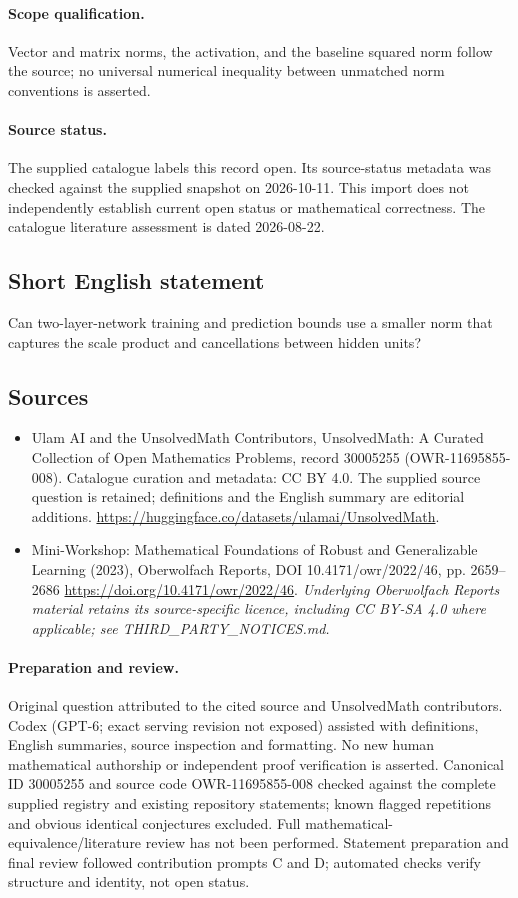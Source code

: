 \documentclass[11pt]{article}
\begin{document}
\paragraph{Scope qualification.}
Vector and matrix norms, the activation, and the baseline squared norm follow the source; no universal numerical inequality between unmatched norm conventions is asserted.
\paragraph{Source status.}
The supplied catalogue labels this record open. Its source-status metadata was checked against the supplied snapshot on 2026-10-11. This import does not independently establish current open status or mathematical correctness. The catalogue literature assessment is dated 2026-08-22.
\subsection{Short English statement}
Can two-layer-network training and prediction bounds use a smaller norm that captures the scale product and cancellations between hidden units?
\subsection{Sources}
\begin{itemize}
\item[S1] Ulam AI and the UnsolvedMath Contributors, UnsolvedMath: A Curated Collection of Open Mathematics Problems, record 30005255 (OWR-11695855-008). Catalogue curation and metadata: CC BY 4.0. The supplied source question is retained; definitions and the English summary are editorial additions.
\url{https://huggingface.co/datasets/ulamai/UnsolvedMath}.
\item[S2] Mini-Workshop: Mathematical Foundations of Robust and Generalizable Learning (2023), Oberwolfach Reports, DOI 10.4171/owr/2022/46, pp. 2659--2686
\url{https://doi.org/10.4171/owr/2022/46}.
\textit{Underlying Oberwolfach Reports material retains its source-specific licence, including CC BY-SA 4.0 where applicable; see THIRD\_PARTY\_NOTICES.md.}
\end{itemize}
\paragraph{Preparation and review.}
Original question attributed to the cited source and UnsolvedMath contributors. Codex (GPT-6; exact serving revision not exposed) assisted with definitions, English summaries, source inspection and formatting. No new human mathematical authorship or independent proof verification is asserted. Canonical ID 30005255 and source code OWR-11695855-008 checked against the complete supplied registry and existing repository statements; known flagged repetitions and obvious identical conjectures excluded. Full mathematical-equivalence/literature review has not been performed. Statement preparation and final review followed contribution prompts C and D; automated checks verify structure and identity, not open status.
\label{end:30005255}
\end{document}
